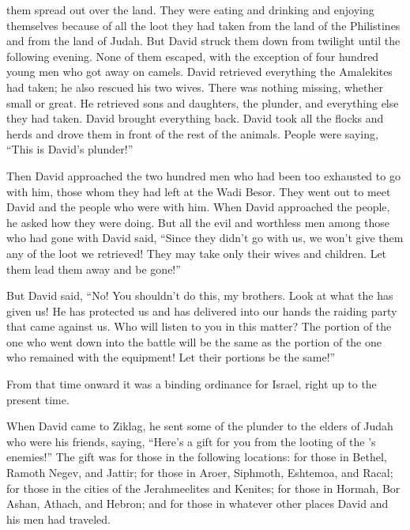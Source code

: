 {them spread
out over
the land.
They were eating
and drinking
and enjoying
themselves because of all
the loot
they had
taken
from the land
of the Philistines
and from the land
of Judah.
But David
struck
them down from twilight
until
the following
evening.
None
of them escaped,
with the exception
of four
hundred
young
men
who
got away
on
camels.
David
retrieved
everything
the Amalekites
had taken;
he
also rescued
his two
wives.
There was nothing
missing,
whether
small
or great.
He retrieved
sons
and daughters,
the plunder,
and everything
else they had
taken.
David
brought
everything
back.
David
took
all
the flocks
and herds
and drove
them in front
of the rest of the animals.
People were saying,
“This
is David’s
plunder!”
\par }{\PP {}Then David
approached
the two hundred
men
who
had been too exhausted
to go
with
him,
those whom they had left
at the Wadi
Besor.
They went out
to meet
David
and the people
who
were with
him. When David
approached
the people,
he asked
how they were doing.
But
all
the evil
and worthless
men
among those who had
gone
with
David
said,
“Since
they didn’t
go
with
us, we won’t give
them any
of the loot
we
retrieved! They may take only
their wives
and children.
Let them lead
them away and be gone!”
\par }{\PP {}But David
said,
“No! You shouldn’t do
this,
my brothers.
Look at what
the {}
has given
us! He has protected
us and has delivered
into our hands
the raiding party
that came
against us.
Who
will listen
to you in this
matter? The portion
of the one who went down
into the battle
will be the same as the portion
of the one who remained
with the equipment! Let their portions be the same!”
\par }{\PP {}From that time
onward
it was
a binding
ordinance
for Israel,
right
up to the present
time.
\par }{\PP {}When David
came
to
Ziklag,
he sent
some of the plunder
to the elders
of Judah
who were his friends,
saying,
“Here’s
a gift
for you from the looting
of the
{}’s
enemies!”
The gift was for those in the following locations: for those in Bethel,
Ramoth Negev,
and Jattir;
for those in Aroer,
Siphmoth,
Eshtemoa,
and Racal;
for those in the cities
of the Jerahmeelites
and Kenites;
for those in Hormah,
Bor Ashan,
Athach,
and Hebron;
and for those in whatever
other places
David
and his men
had
traveled.

}
